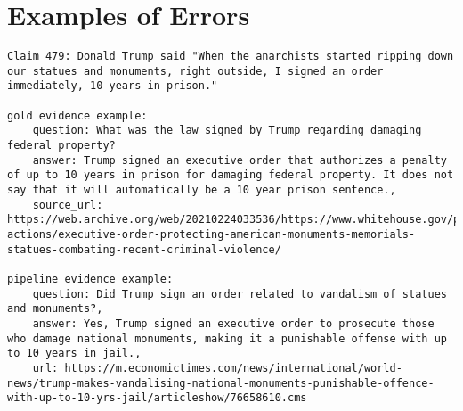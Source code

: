 
\section{Examples of Errors}
\label{appendix_sec:errors}

\begin{lstlisting}[caption={Example of a claim where our pipeline uses newspaper sources instead of official government sources.}, label={lst:gov_error}, breaklines=true, breakatwhitespace=false, columns=fullflexible]
Claim 479: Donald Trump said "When the anarchists started ripping down our statues and monuments, right outside, I signed an order immediately, 10 years in prison."

gold evidence example: 
    question: What was the law signed by Trump regarding damaging federal property?
    answer: Trump signed an executive order that authorizes a penalty of up to 10 years in prison for damaging federal property. It does not say that it will automatically be a 10 year prison sentence.,
    source_url: https://web.archive.org/web/20210224033536/https://www.whitehouse.gov/presidential-actions/executive-order-protecting-american-monuments-memorials-statues-combating-recent-criminal-violence/

pipeline evidence example: 
    question: Did Trump sign an order related to vandalism of statues and monuments?, 
    answer: Yes, Trump signed an executive order to prosecute those who damage national monuments, making it a punishable offense with up to 10 years in jail.,
    url: https://m.economictimes.com/news/international/world-news/trump-makes-vandalising-national-monuments-punishable-offence-with-up-to-10-yrs-jail/articleshow/76658610.cms
    
\end{lstlisting}

